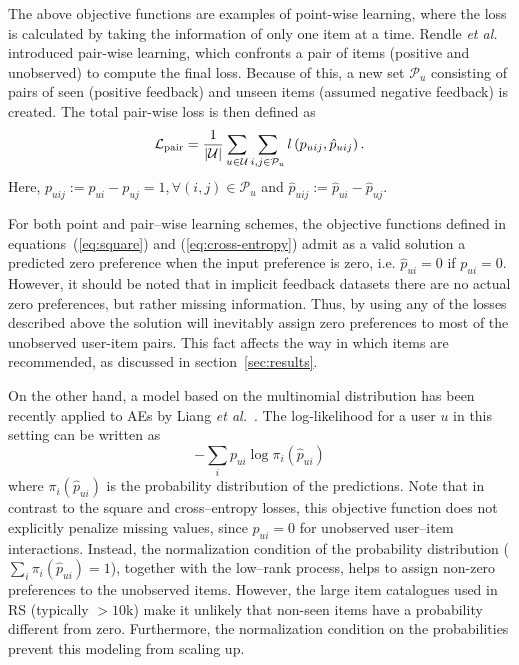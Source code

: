 The above objective functions are examples of point-wise learning, where the loss is calculated by taking the information of only one item at a time. Rendle \emph{et al.}~\cite{Rendle:2009:BPR} introduced 
pair-wise learning, which confronts a pair of items (positive and  unobserved) to compute the final loss. 
Because of this, a new set $\mathcal{P}_u$  consisting of pairs of seen (positive feedback) and unseen items  (assumed negative feedback) is created. The total pair-wise loss is then defined as~\cite{Wu:2016:CDAE-topN}
\begin{equation}\label{eq:pair-wise}
\mathcal{L}_{\rm pair}=\frac{1}{|\mathcal{U}|}\sum_{u\in \mathcal{U}} 
\sum_{i,j\in\mathcal{P}_u} l\left(p_{uij},\hat{p}_{uij}\right).
\end{equation}
Here, $p_{uij}:=p_{ui}-p_{uj}=1,\forall (i,j)\in\mathcal{P}_u$ and $\hat{p}_{uij}:=\hat{p}_{ui}-\hat{p}_{uj}$. 

For both point and pair--wise learning schemes, the objective functions defined in equations~(\ref{eq:square}) and (\ref{eq:cross-entropy}) admit as a valid solution a predicted zero preference 
when the input preference is zero, i.e. $\hat{p}_{ui}=0$ if $p_{ui}=0$. However, it should be noted that in implicit feedback datasets there are no actual zero preferences, but rather missing information. Thus, by using any of the losses described above the  solution will inevitably assign zero preferences to most of the unobserved user-item pairs.  This fact affects the way in which items are recommended, as discussed in section~\ref{sec:results}.

On the other hand, a model based on the multinomial distribution has been recently applied to AEs by Liang \emph{et al.}~\cite{liang:2018:VAE}. The log-likelihood for a user $u$ in this setting can be written as
\begin{equation}\label{eq:multinomial}
-\sum_i p_{ui}\log\pi_i\left(\hat{p}_{ui}\right)
\end{equation}
where $\pi_i\left(\hat{p}_{ui}\right)$ is the probability distribution of the predictions.
Note that in contrast to the square and cross--entropy losses, this objective function does not explicitly penalize missing values, since $p_{ui}=0$ for unobserved user--item interactions.
Instead, the normalization condition of the probability distribution  ($\sum_i\pi_i\left(\hat{p}_{ui}\right)=1$), together with the low--rank process, helps to assign non-zero preferences to the unobserved items. However, the large item catalogues used in RS (typically  $>10$k) make it unlikely that non-seen items have a probability different from zero. Furthermore, the normalization condition on the  probabilities prevent this modeling from scaling up.



